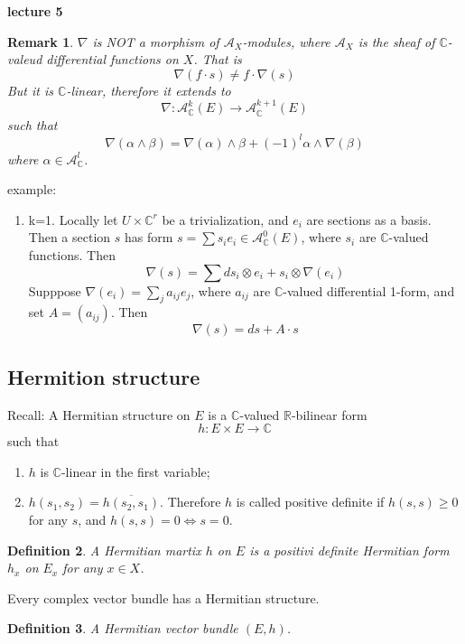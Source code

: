 \documentclass{article}
\newtheorem{definition}{Definition}[subsection]
\newtheorem{remark}[definition]{Remark}
\begin{document}
\textbf{lecture 5}
\begin{remark}
  $\nabla$ is NOT a morphism of $\mathcal{A}_{X}$-modules, where $\mathcal{A}_{X}$ is the sheaf of $\mathbb{C}$-valeud differential functions on $X$. That is
  \[
    \nabla(f\cdot s) \not = f\cdot \nabla(s)
  \]
  But it is $\mathbb{C}$-linear, therefore it extends to
  \[
    \nabla: \mathcal{A}^{k}_{\mathbb{C}}(E)\to \mathcal{A}_{\mathbb{C}}^{k+1}(E)
  \]
  such that
  \[
    \nabla (\alpha \wedge \beta )= \nabla(\alpha)\wedge \beta + (-1)^{l}\alpha \wedge \nabla(\beta)
  \]
  where $\alpha \in \mathcal{A}^{l}_{\mathbb{C}}$.
\end{remark}
example:
\begin{enumerate}
  \item k=1. Locally let $U \times \mathbb{C}^{r}$ be a trivialization, and $e_{i}$ are sections as a basis. Then a section  $s$ has form $s=\sum s_{i}e_{i} \in \mathcal{A}_{\mathbb{C}}^{0}(E)$, where $s_{i}$ are  $\mathbb{C}$-valued functions. Then
    \[
      \nabla(s)= \sum ds_{i}\otimes e_{i} + s_{i} \otimes \nabla(e_{i})
    \]
  Supppose $\nabla(e_{i})=\sum_{j} a_{ij}e_{j}$, where $a_{ij}$ are $\mathbb{C}$-valued differential 1-form, and set $A=(a_{ij})$.  Then
  \[
    \nabla(s)= ds + A\cdot s 
  \]
\end{enumerate}

\subsection{Hermition structure}
Recall: A Hermitian structure on $E$ is a $\mathbb{C}$-valued $\mathbb{R}$-bilinear form
\[
  h: E\times E \to \mathbb{C}
\]
such that
\begin{enumerate}
  \item $h$ is $\mathbb{C}$-linear in the first variable;
  \item $h(s_{1},s_{2})=\overline{h(s_{2},s_{1})}$. Therefore $h$ is called positive definite if $h(s,s)\geqslant 0$ for any $s$, and $h(s,s)=0 \Leftrightarrow s=0$.
\end{enumerate}
\begin{definition}
  A Hermitian martix $h$ on $E$ is a positivi definite Hermitian form $h_{x}$ on  $E_{x}$ for any $x\in X$.  
\end{definition}
Every complex vector bundle has a Hermitian structure.

\begin{definition}
  A Hermitian vector bundle $(E,h)$.
\end{definition}
\end{document}
